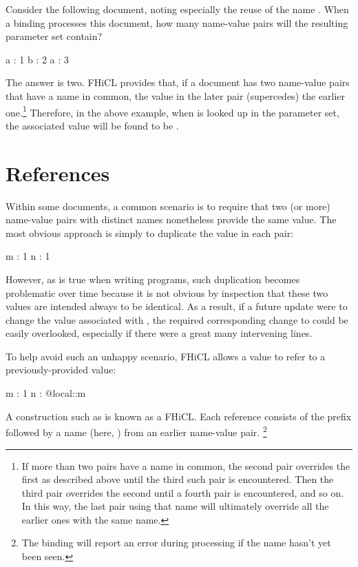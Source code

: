 \documentclass[draftmode,draftwater]{memarticle}
\newcommand{\fhicl}%
 {FHiCL\xspace}
\begin{document}
Consider the following document,
noting especially the reuse of the name .
When a binding processes this document,
how many name-value pairs
will the resulting parameter set contain?
\Needspace{0.5in}
\begin{fcllisting}[texcl,escapechar=`]
a : 1
b : 2
a : 3
\end{fcllisting}
The answer is two.
\fhicl provides that,
if a document has two name-value pairs
that have a name in common,
the value in the later pair
 (supercedes) the earlier one.\footnote{%
  If more than two pairs
  have a name in common,
  the second pair overrides the first
  as described above
  until the third such pair is encountered.
  Then the third pair overrides the second
  until a fourth pair is encountered,
  and so on.
  In this way,
  the last pair using that name
  will ultimately override all the earlier ones
  with the same name.%
}
Therefore, in the above example,
when  is looked up in the parameter set,
the associated value will be found to be .

\section{References}

Within some documents,
a common scenario
is to require that
two (or more) name-value pairs
with distinct names
nonetheless provide the same value.
The most obvious approach
is simply to duplicate the value
in each pair:
\Needspace{0.34in}
\begin{fcllisting}[texcl,escapechar=`]
m : 1
n : 1
\end{fcllisting}
However,
as is true when writing programs,
such duplication becomes problematic over time
because it is not obvious by inspection
that these two values
are intended always to be identical.
As a result,
if a future update
were to change the value associated with ,
the required corresponding change to 
could be easily overlooked,
especially if there were a great many intervening lines.

To help avoid such an unhappy scenario,
\fhicl allows a value to refer
to a previously-provided value:
\Needspace{0.34in}
\begin{fcllisting}[texcl,escapechar=`]
m : 1
n : @local::m
\end{fcllisting}
A construction such as 
is known as a \fhicl {}.
Each reference consists of the prefix 
followed by a name (here, )
from an earlier name-value pair.%
\footnote{%
  The binding will report an error during processing
  if the name hasn't yet been seen.%
}
\end{document}
